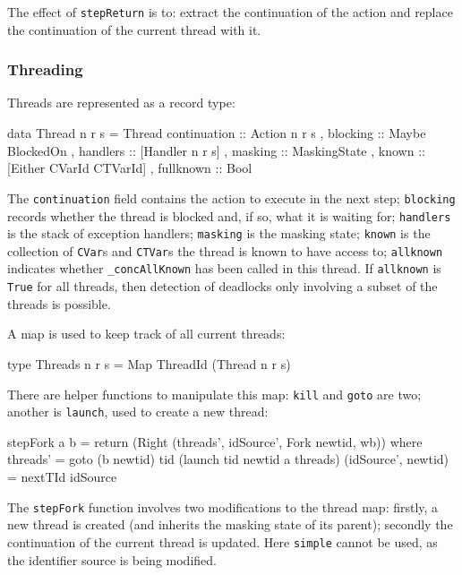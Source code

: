 The effect of \verb|stepReturn| is to: extract the continuation of the
action and replace the continuation of the current thread with it.

\subsubsection{Threading}
\label{sec:execution-stepwise-threading}

Threads are represented as a record type:

\begin{haskellcode}
data Thread n r s = Thread
  { continuation :: Action n r s
  , blocking     :: Maybe BlockedOn
  , handlers     :: [Handler n r s]
  , masking      :: MaskingState
  , known        :: [Either CVarId CTVarId]
  , fullknown    :: Bool
  }
\end{haskellcode}

The \verb|continuation| field contains the action to execute in the
next step; \verb|blocking| records whether the thread is blocked and,
if so, what it is waiting for; \verb|handlers| is the stack of
exception handlers; \verb|masking| is the masking state; \verb|known|
is the collection of \verb|CVar|s and \verb|CTVar|s the thread is
known to have access to; \verb|allknown| indicates whether
\verb|_concAllKnown| has been called in this thread. If
\verb|allknown| is \verb|True| for all threads, then detection of
deadlocks only involving a subset of the threads is possible.

A map is used to keep track of all current threads:

\begin{haskellcode}
type Threads n r s = Map ThreadId (Thread n r s)
\end{haskellcode}

There are helper functions to manipulate this map: \verb|kill| and
\verb|goto| are two; another is \verb|launch|, used to create a new
thread:

\begin{haskellcode}
stepFork a b = return (Right (threads', idSource', Fork newtid, wb)) where
  threads' = goto (b newtid) tid (launch tid newtid a threads)
  (idSource', newtid) = nextTId idSource
\end{haskellcode}

The \verb|stepFork| function involves two modifications to the thread
map: firstly, a new thread is created (and inherits the masking state
of its parent); secondly the continuation of the current thread is
updated. Here \verb|simple| cannot be used, as the identifier source
is being modified.

